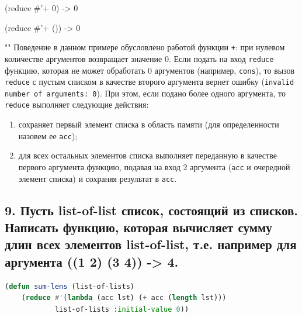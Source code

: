 \documentclass[12pt]{report}
\begin{document}
(reduce \#'+ 0) -> 0

(reduce \#'+ ()) -> 0

""\newline
Поведение в данном примере обусловлено работой функции \texttt{+}: при нулевом количестве аргументов возвращает значение 0. Если подать на вход \texttt{reduce} функцию, которая не может обработать 0 аргументов (например,  \texttt{cons}), то вызов \texttt{reduce} с пустым списком в качестве второго аргумента вернет ошибку (\texttt{invalid number of arguments: 0}). При этом, если подано более одного аргумента, то \texttt{reduce} выполняет следующие действия:
\begin{enumerate}
	\item сохраняет первый элемент списка в область памяти (для определенности назовем ее \texttt{acc});
	\item для всех остальных элементов списка выполняет переданную в качестве первого аргумента функцию, подавая на вход 2 аргумента (\texttt{acc} и очередной элемент списка) и сохраняя результат в \texttt{acc}.
\end{enumerate}

\subsection*{9. Пусть list-of-list список, состоящий из списков. Написать функцию, которая вычисляет
	сумму длин всех элементов list-of-list, т.е. например для аргумента ((1 2) (3 4)) -> 4.}

\begin{lstlisting}[label=6xd, caption=Решение задания №9, language=lisp]
(defun sum-lens (list-of-lists)
	(reduce #'(lambda (acc lst) (+ acc (length lst)))
			list-of-lists :initial-value 0))

\end{lstlisting}
\end{document}
